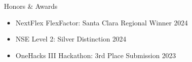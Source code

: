 \documentclass[
  10pt, %
]{public/resume/resume} %
\begin{document}
\begin{rSection}{Honors \& Awards}

  \begin{itemize}
      \setlength\itemsep{-0.7em} %
        
      \item NextFlex FlexFactor: Santa Clara Regional Winner \hfill 2024
              
      \item NSE Level 2: Silver Distinction \hfill 2024
              
      \item OneHacks III Hackathon: 3rd Place Submission \hfill 2023
              


    \end{itemize}

\end{rSection}
\end{document}
